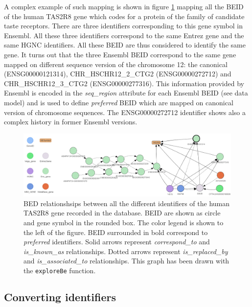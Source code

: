 \documentclass[9pt,a4paper,]{extarticle}
\theoremstyle{definition}
\theoremstyle{definition}
\theoremstyle{definition}
\theoremstyle{remark}
\begin{document}
A complex example of such mapping is shown in figure \ref{fig:TAS2R8}
mapping all the BEID of the human TAS2R8 gene which codes for a protein
of the family of candidate taste receptors. There are three identifiers
corresponding to this gene symbol in Ensembl. All these three identifiers
correspond to the same Entrez gene and the same HGNC identifiers.
All these BEID are thus considered to identify the same gene. It turns out
that the three Ensembl BEID correspond to the same gene mapped on different
sequence version of the chromosome 12: the canonical (ENSG00000121314),
CHR\_HSCHR12\_2\_CTG2 (ENSG00000272712)
and CHR\_HSCHR12\_3\_CTG2 (ENSG00000277316).
This information provided by Ensembl is encoded in the \emph{seq\_region}
attribute for each Ensembl BEID (see data model)
and is used to define \emph{preferred} BEID which are mapped on canonical version
of chromosome sequences.
The ENSG00000272712 identifier shows also a complex history in former
Ensembl versions.

\begin{figure}

{\centering \includegraphics[width=1\linewidth]{img/TAS2R8-Identifiers} 

}

\caption{BED relationshsips between all the different identifiers of the human TAS2R8 gene recorded in the database. BEID are shown as circle and gene symbol in the rounded box. The color legend is shown to the left of the figure. BEID surrounded in bold correspond to \emph{preferred} identifiers. Solid arrows represent \emph{correspond\_to} and \emph{is\_known\_as} relationships. Dotted arrows represent \emph{is\_replaced\_by} and \emph{is\_associated\_to} relationships. This graph has been drawn with the \texttt{exploreBe} function.}\label{fig:TAS2R8}
\end{figure}

\subsection{Converting identifiers}\label{converting-identifiers}
\end{document}

